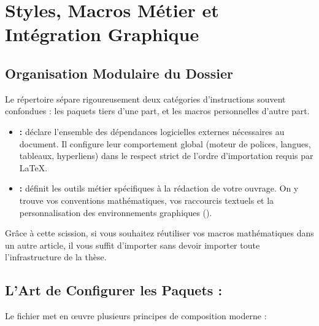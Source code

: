 \chapter{Styles, Macros Métier et Intégration Graphique}
\label{chap:styles-macros-graphisme}

\section{Organisation Modulaire du Dossier }
\label{sec:config-organisation}

Le répertoire  sépare rigoureusement deux catégories d'instructions souvent confondues :
les paquets tiers d'une part, et les macros personnelles d'autre part.

\begin{itemize}
  \item \textbf{ :}
  déclare l'ensemble des dépendances logicielles externes nécessaires au document.
  Il configure leur comportement global (moteur de polices, langues, tableaux, hyperliens)
  dans le respect strict de l'ordre d'importation requis par \LaTeX{}.
  \item \textbf{ :}
  définit les outils métier spécifiques à la rédaction de votre ouvrage.
  On y trouve vos conventions mathématiques, vos raccourcis textuels
  et la personnalisation des environnements graphiques ().
\end{itemize}

Grâce à cette scission, si vous souhaitez réutiliser vos macros mathématiques dans un autre article,
il vous suffit d'importer  sans devoir importer toute l'infrastructure de la thèse.

\section{L'Art de Configurer les Paquets : }
\label{sec:packages-detail}

Le fichier  met en \oe{}uvre plusieurs principes de composition moderne :

